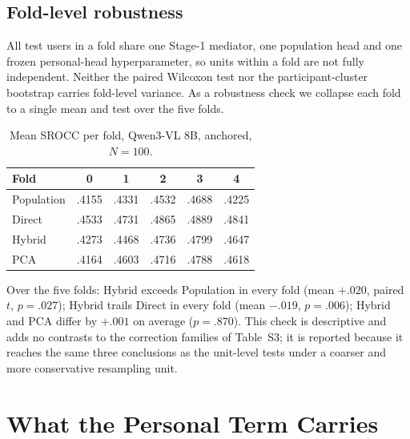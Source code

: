 \subsection{Fold-level robustness}

All test users in a fold share one Stage-1 mediator, one population head and
one frozen personal-head hyperparameter, so units within a fold are not fully
independent. Neither the paired Wilcoxon test nor the participant-cluster
bootstrap carries fold-level variance. As a robustness check we collapse each
fold to a single mean and test over the five folds.

\begin{table}[t]
\centering
\begin{threeparttable}
\caption{Mean SROCC per fold, Qwen3-VL 8B, anchored, $N=100$.}
\label{tab:fold_robust}
\small
\setlength{\tabcolsep}{5pt}
\begin{tabular}{lccccc}
\toprule
Fold & 0 & 1 & 2 & 3 & 4 \\
\midrule
Population & .4155 & .4331 & .4532 & .4688 & .4225 \\
Direct     & .4533 & .4731 & .4865 & .4889 & .4841 \\
Hybrid     & .4273 & .4468 & .4736 & .4799 & .4647 \\
PCA        & .4164 & .4603 & .4716 & .4788 & .4618 \\
\bottomrule
\end{tabular}
\begin{tablenotes}[flushleft]\footnotesize
\item Over the five folds: Hybrid exceeds Population in every fold
(mean $+.020$, paired $t$, $p=.027$); Hybrid trails Direct in every fold
(mean $-.019$, $p=.006$); Hybrid and PCA differ by $+.001$ on average
($p=.870$). This check is descriptive and adds no contrasts to the correction
families of Table~S3; it is reported because it reaches the same three
conclusions as the unit-level tests under a coarser and more conservative
resampling unit.
\end{tablenotes}
\end{threeparttable}
\end{table}


\section{What the Personal Term Carries}
\label{sec:supp_personal_share}

